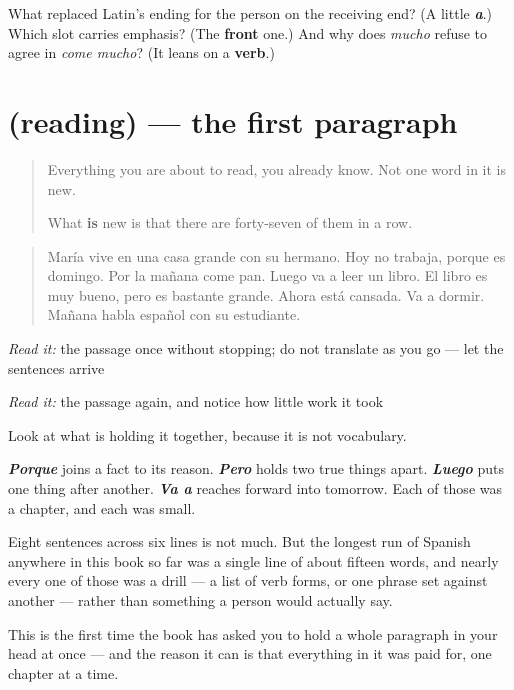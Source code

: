 \begin{tcolorbox}[breakable,colback=teal!4,colframe=teal!35!black,title={Before you move on}]
What replaced Latin's ending for the person on the receiving end? (A little \emph{\textbf{a}}.) Which slot carries emphasis? (The \textbf{front} one.) And why does \emph{mucho} refuse to agree in \emph{come mucho}? (It leans on a \textbf{verb}.)
\end{tcolorbox}
\section[(reading)]{(reading) — the first paragraph}

\label{lesson:ES-C67-primera-lectura}



\begin{quote}
Everything you are about to read, you already know. Not one word in it is new.

What \textbf{is} new is that there are forty-seven of them in a row.
\end{quote}

\begin{tcolorbox}[breakable,skin=enhanced,colback=orange!6,colframe=orange!45!black,boxrule=0.5pt,arc=1mm,left=6pt,right=6pt,top=4pt,bottom=4pt,fonttitle=\bfseries,title={Read this}]
\begin{quote}
María vive en una casa grande con su hermano. Hoy no trabaja, porque es domingo. Por la mañana come pan. Luego va a leer un libro. El libro es muy bueno, pero es bastante grande. Ahora está cansada. Va a dormir. Mañana habla español con su estudiante.
\end{quote}

\emph{Read it:} the passage once without stopping; do not translate as you go — let the sentences arrive

\emph{Read it:} the passage again, and notice how little work it took
\end{tcolorbox}

\begin{culture}
Look at what is holding it together, because it is not vocabulary.

\emph{\textbf{Porque}} joins a fact to its reason. \emph{\textbf{Pero}} holds two true things apart. \emph{\textbf{Luego}} puts one thing after another. \emph{\textbf{Va a}} reaches forward into tomorrow. Each of those was a chapter, and each was small.

Eight sentences across six lines is not much. But the longest run of Spanish anywhere in this book so far was a single line of about fifteen words, and nearly every one of those was a drill — a list of verb forms, or one phrase set against another — rather than something a person would actually say.

This is the first time the book has asked you to hold a whole paragraph in your head at once — and the reason it can is that everything in it was paid for, one chapter at a time.
\end{culture}

